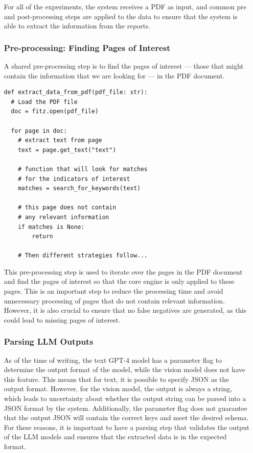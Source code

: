 \documentclass[english, 12pt, a4paper, elec, utf8, a-2b, online]{aaltothesis}
\begin{document}
For all of the experiments, the system receives a \ac{PDF} as input, and common pre and post-processing steps are applied to the data to ensure that the system is able to extract the information from the reports.

\subsubsection{Pre-processing: Finding Pages of Interest}

A shared pre-processing step is to find the pages of interest --- those that might contain the information that we are looking for --- in the \ac{PDF} document.

\begin{verbatim}
def extract_data_from_pdf(pdf_file: str):
  # Load the PDF file
  doc = fitz.open(pdf_file)

  for page in doc:
    # extract text from page
    text = page.get_text("text")

    # function that will look for matches
    # for the indicators of interest
    matches = search_for_keywords(text)

    # this page does not contain
    # any relevant information
    if matches is None:
        return

    # Then different strategies follow...
\end{verbatim}

This pre-processing step is used to iterate over the pages in the \ac{PDF} document and find the pages of interest so that the core engine is only applied to these pages.
This is an important step to reduce the processing time and avoid unnecessary processing of pages that do not contain relevant information.
However, it is also crucial to ensure that no false negatives are generated, as this could lead to missing pages of interest.

\subsubsection{Parsing LLM Outputs}

As of the time of writing, the text \ac{GPT}-4 model has a parameter flag to determine the output format of the model, while the vision model does not have this feature.
This means that for text, it is possible to specify \ac{JSON} as the output format.
However, for the vision model, the output is always a string, which leads to uncertainty about whether the output string can be parsed into a \ac{JSON} format by the system.
Additionally, the parameter flag does not guarantee that the output \ac{JSON} will contain the correct keys and meet the desired schema.
For these reasons, it is important to have a parsing step that validates the output of the \ac{LLM} models and ensures that the extracted data is in the expected format.
\end{document}
